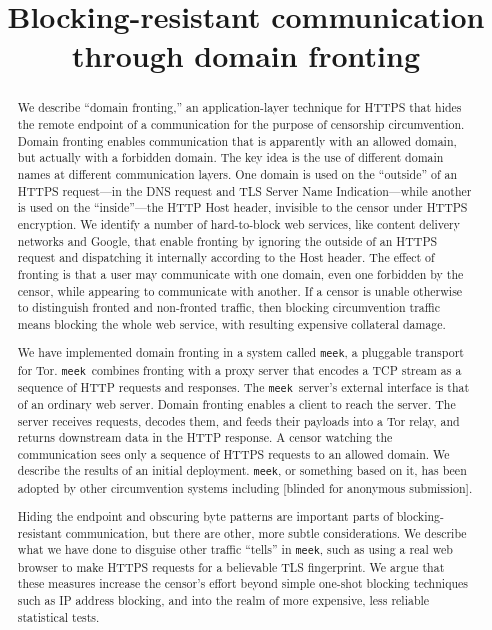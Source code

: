 \documentclass[conference]{IEEEtran}
\newcommand{\meek}{\texttt{meek}\xspace}
\begin{document}
\title{Blocking-resistant communication\\through domain fronting}


\maketitle

\begin{abstract}
We describe ``domain fronting,'' an application-layer technique
for HTTPS
that hides the remote endpoint of a communication
for the purpose of censorship circumvention.
Domain fronting enables communication that is apparently with an allowed domain,
but actually with a forbidden domain.
The key idea is the use of different domain names at different communication layers.
One domain is used on the ``outside'' of an HTTPS request---in the DNS request and
TLS Server Name Indication---while another is used
on the ``inside''---the HTTP Host header, invisible to the
censor under HTTPS encryption.
We identify a number of hard-to-block web services,
like content delivery networks and Google,
that enable fronting by ignoring the outside of an HTTPS request
and dispatching it internally according to the Host header.
The effect of fronting is that a user may communicate with one domain,
even one forbidden by the censor,
while appearing to communicate with another.
If a censor is unable otherwise to distinguish fronted and non-fronted traffic,
then blocking circumvention traffic means blocking the whole web service,
with resulting expensive collateral damage.

We have implemented domain fronting in a system called \meek,
a pluggable transport for Tor.
\meek\ combines fronting with a proxy server that encodes a TCP stream
as a sequence of HTTP requests and responses.
The \meek\ server's external interface is that of an ordinary web server.
Domain fronting enables a client to reach the server.
The server receives requests, decodes them, and feeds their payloads into a Tor relay,
and returns downstream data in the HTTP response.
A censor watching the communication sees only a sequence of HTTPS requests to an allowed domain.
We describe the results of an initial deployment.
\meek, or something based on it,
has been adopted by other circumvention systems including
[blinded for anonymous submission].

Hiding the endpoint and obscuring byte patterns are important parts of blocking-resistant communication,
but there are other, more subtle considerations.
We describe what we have done to disguise other traffic ``tells'' in \meek,
such as using a real web browser to make HTTPS requests
for a believable TLS fingerprint.
We argue that these measures increase the censor's effort
beyond simple one-shot blocking techniques such as IP address blocking, and into
the realm of more expensive, less reliable statistical tests.
\end{abstract}
\end{document}
